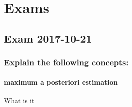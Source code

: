 \documentclass[10pt,a4paper]{article}
\begin{document}
\section{Exams}

\subsection{Exam 2017-10-21}

\subsubsection{Explain the following concepts:}

\paragraph{maximum a posteriori estimation}

What is it
\end{document}
